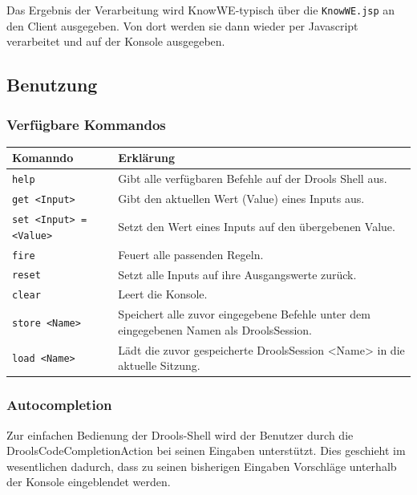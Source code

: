 \documentclass[a4paper,12pt]{report}
\begin{document}
  Das Ergebnis der Verarbeitung wird KnowWE-typisch über die \texttt{KnowWE.jsp} an den Client ausgegeben. Von dort werden sie dann wieder per Javascript verarbeitet und auf der Konsole ausgegeben. 


  \subsection{Benutzung}
  \subsubsection{Verfügbare Kommandos}
  
  \begin{tabular}{l|p{320pt}}

  \textbf{Komanndo} & \textbf{Erklärung}\\
  \hline
  
  \texttt{help} & Gibt alle verfügbaren Befehle auf der Drools Shell aus.\\
  \texttt{get <Input>} & Gibt den aktuellen Wert (Value) eines Inputs aus.\\
  \texttt{set <Input> = <Value>} & Setzt den Wert eines Inputs auf den übergebenen Value.\\
  \texttt{fire} & Feuert alle passenden Regeln.\\
  \texttt{reset} & Setzt alle Inputs auf ihre Ausgangswerte zurück.\\
  \texttt{clear} & Leert die Konsole.\\
  \texttt{store <Name>} & Speichert alle zuvor eingegebene Befehle unter dem eingegebenen Namen als DroolsSession.\\
  \texttt{load <Name>} & Lädt die zuvor gespeicherte DroolsSession <Name> in die aktuelle Sitzung.\\
  
  \end{tabular}
  

  \subsubsection{Autocompletion}
  
  Zur einfachen Bedienung der Drools-Shell wird der Benutzer durch die DroolsCodeCompletionAction bei seinen Eingaben unterstützt. Dies geschieht im wesentlichen dadurch, dass zu seinen bisherigen Eingaben Vorschläge unterhalb der Konsole eingeblendet werden. 
  
\end{document}
